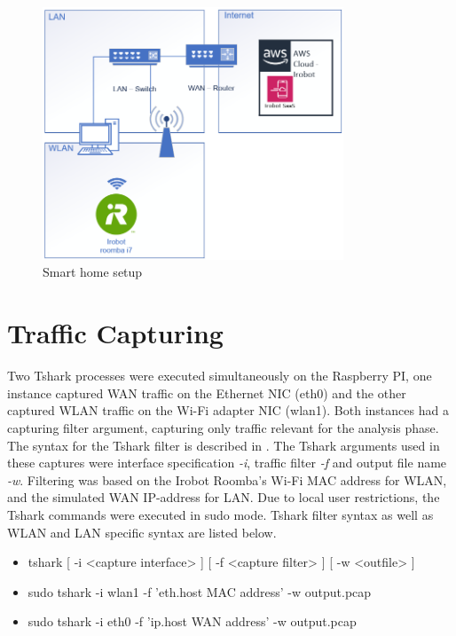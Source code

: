\begin{figure}[H]
    \centering
    \includegraphics[width=0.8\textwidth]{figures/SmartHomeSetup.png}
    \caption{Smart home setup \cite{irobot}}
    \label{fig:SmartHomeSetup}
\end{figure}

\section{Traffic Capturing} 

Two Tshark processes were executed simultaneously on the Raspberry PI, one instance captured \gls{WAN} traffic on the Ethernet \gls{NIC} (eth0) and the other captured \gls{WLAN} traffic on the \gls{Wi-Fi} adapter \gls{NIC} (wlan1). Both instances had a capturing filter argument, capturing only traffic relevant for the analysis phase. The syntax for the Tshark filter is described in \cite{tshark_filter}. The Tshark arguments used in these captures were interface specification \textit{-i}, traffic filter \textit{-f} and output file name \textit{-w}. Filtering was based on the Irobot Roomba's \gls{Wi-Fi} \gls{MAC} address for \gls{WLAN}, and the simulated \gls{WAN} \gls{IP}-address for \gls{LAN}. Due to local user restrictions, the Tshark commands were executed in sudo mode. Tshark filter syntax as well as \gls{WLAN} and \gls{LAN} specific syntax are listed below. 

\begin{itemize}
    \item tshark [ -i <capture interface> ] [ -f <capture filter> ] [ -w <outfile> ]
    \item sudo tshark -i wlan1 -f 'eth.host MAC address' -w output.pcap
    \item sudo tshark -i eth0 -f 'ip.host \gls{WAN} address' -w output.pcap
\end{itemize}

